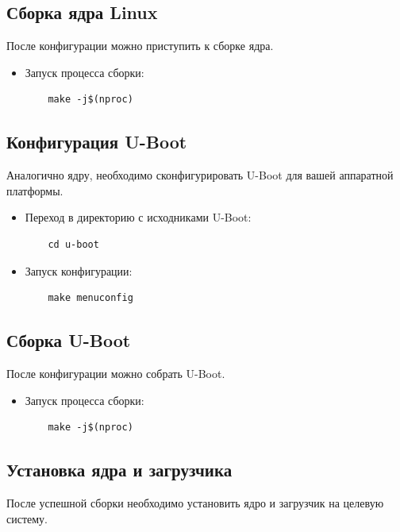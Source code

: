\documentclass[16pt]{article}
\begin{document}
\subsection{Сборка ядра Linux}

После конфигурации можно приступить к сборке ядра.

\begin{itemize}
    \item Запуск процесса сборки:
    \begin{verbatim}
    make -j$(nproc)
    \end{verbatim}
\end{itemize}

\subsection{Конфигурация U-Boot}

Аналогично ядру, необходимо сконфигурировать U-Boot для вашей аппаратной платформы.

\begin{itemize}
    \item Переход в директорию с исходниками U-Boot:
    \begin{verbatim}
    cd u-boot
    \end{verbatim}

    \item Запуск конфигурации:
    \begin{verbatim}
    make menuconfig
    \end{verbatim}
\end{itemize}

\subsection{Сборка U-Boot}

После конфигурации можно собрать U-Boot.

\begin{itemize}
    \item Запуск процесса сборки:
    \begin{verbatim}
    make -j$(nproc)
    \end{verbatim}
\end{itemize}

\subsection{Установка ядра и загрузчика}

После успешной сборки необходимо установить ядро и загрузчик на целевую систему.
\end{document}
